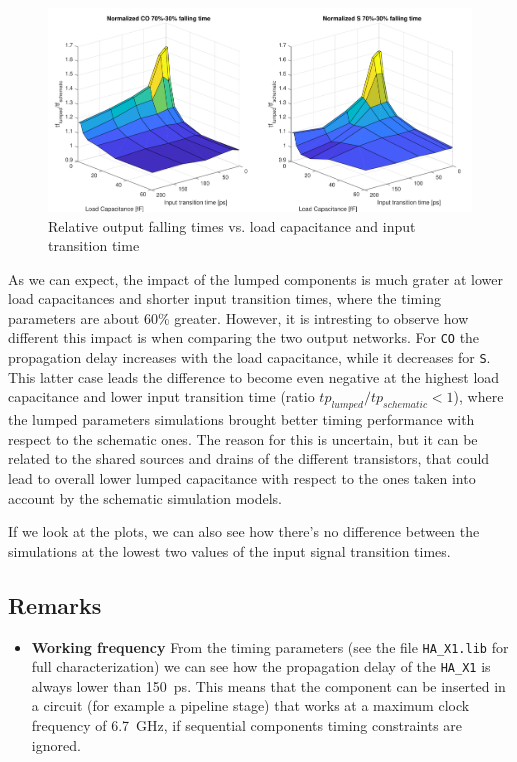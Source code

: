 \documentclass[a4paper]{article}
\newcommand{\ha}{\texttt{HA\_X1}\xspace}
\begin{document}
\begin{figure}[ht]
	\includegraphics[width=\linewidth]{Images/HA/t_F_diff_crop.pdf}
	\caption{Relative output falling times vs. load capacitance and input transition time}
	\label{fig:HA_t_F_diff}
\end{figure}

As we can expect, the impact of the lumped components is much grater at lower load capacitances and shorter input transition times, where the timing parameters are about 60\% greater. However, it is intresting to observe how different this impact is when comparing the two output networks. For \texttt{CO} the propagation delay increases with the load capacitance, while it decreases for \texttt{S}. This latter case leads the difference to become even negative at the highest load capacitance and lower input transition time (ratio $tp_{lumped}/tp_{schematic} < 1$), where the lumped parameters simulations brought better timing performance with respect to the schematic ones. The reason for this is uncertain, but it can be related to the shared sources and drains of the different transistors, that could lead to overall lower lumped capacitance with respect to the ones taken into account by the schematic simulation models.

If we look at the plots, we can also see how there's no difference between the simulations at the lowest two values of the input signal transition times.

\subsection{Remarks}

\begin{itemize}
	\item \textbf{Working frequency} From the timing parameters (see the file \texttt{HA\_X1.lib} for full characterization) we can see how the propagation delay of the \ha is always lower than \SI{150}{\pico\second}. This means that the component can be inserted in a circuit (for example a pipeline stage) that works at a maximum clock frequency of \SI{6.7}{\giga\hertz}, if sequential components timing constraints are ignored.
\end{itemize}
\end{document}
